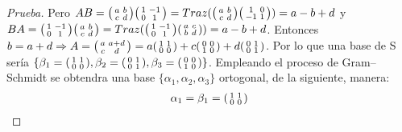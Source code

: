 \documentclass[12pt]{article}
\newenvironment{xmat}
  {\left(\begin{smallmatrix}}
  {\end{smallmatrix}\right)}
\begin{document}
\begin{proof}[Prueba]
Pero $
	AB=\begin{xmat}a & b\\c & d\end{xmat}
		   \begin{xmat}1 & -1\\0 & 1\end{xmat}
	  = Traz(\begin{xmat}a & b\\c & d\end{xmat}
	  	\begin{xmat}1 & 0\\-1 & 1\end{xmat})
	  = a-b+d$ y 
	  $BA=\begin{xmat}1 & -1\\0 & 1\end{xmat}
	  	   \begin{xmat}a & b\\c & d\end{xmat}
	  = Traz(\begin{xmat}1 & -1\\0 & 1\end{xmat}
	  	\begin{xmat}a & c\\b & d\end{xmat})
	  = a-b+d$. Entonces $b = a+d
	  \Rightarrow A=\begin{xmat}a & a+d\\c & d\end{xmat}
		= a\begin{xmat}1 & 1\\0 & 0\end{xmat} +
		  c\begin{xmat}0 & 0\\1 & 0\end{xmat} +
		  d\begin{xmat}0 & 1\\0 & 1\end{xmat}$. Por lo que una base de S sería $\{ 
		  \beta_{1}=\begin{xmat}1 & 1\\0 & 0\end{xmat},
		  \beta_{2}=\begin{xmat}0 & 1\\0 & 1\end{xmat},
		  \beta_{3}=\begin{xmat}0 & 0\\1 & 0\end{xmat}
		   \}$.
Empleando el proceso de Gram–Schmidt se obtendra una base $\{\alpha_{1},\alpha_{2},\alpha_{3}\}$ ortogonal, de la siguiente, manera:
\begin{align*}
\alpha_{1} = \beta_{1} = \begin{xmat}1 & 1\\0 & 0\end{xmat}
\end{align*}


\end{proof}
\end{document}
